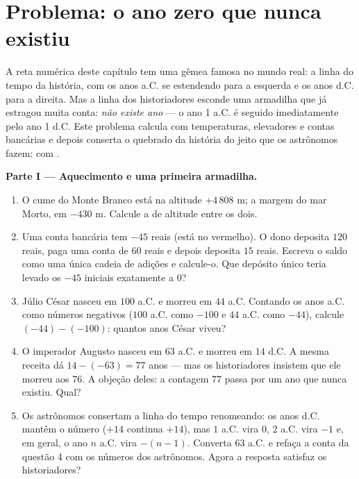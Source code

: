 \section{Problema: o ano zero que nunca existiu}

\begin{problem}
\label{pb:g7:negatives:1}
A reta numérica deste capítulo tem uma gêmea famosa no mundo real: a
linha do tempo da história, com os anos a.C. se estendendo para a
esquerda e os anos d.C. para a direita. Mas a linha dos historiadores
esconde uma armadilha que já estragou muita conta: \emph{não existe ano
} --- o ano 1 a.C. é seguido imediatamente pelo ano 1 d.C. Este
problema calcula com temperaturas, elevadores e contas bancárias e
depois conserta o  quebrado da história do jeito que os astrônomos
fazem: com .

\medskip
\noindent\textbf{Parte I --- Aquecimento e uma primeira armadilha.}
\begin{enumerate}
  \item O cume do Monte Branco está na altitude $+4\,808$ m; a margem
        do mar Morto, em $-430$ m. Calcule a  de altitude
        entre os dois.
  \item Uma conta bancária tem $-45$ reais (está no vermelho). O dono
        deposita $120$ reais, paga uma conta de $60$ reais e depois
        deposita $15$ reais. Escreva o saldo como uma única cadeia de
        adições e calcule-o. Que depósito único teria levado os $-45$
        iniciais exatamente a $0$?
  \item Júlio César nasceu em $100$ a.C. e morreu em $44$ a.C.
        Contando os anos a.C. como números negativos ($100$ a.C. como
        $-100$ e $44$ a.C. como $-44$), calcule $(-44) - (-100)$:
        quantos anos César viveu?
  \item O imperador Augusto nasceu em $63$ a.C. e morreu em $14$ d.C.
        A mesma receita dá $14 - (-63) = 77$ anos --- mas os
        historiadores insistem que ele morreu aos $76$. A objeção
        deles: a contagem $77$ passa por um ano que nunca existiu.
        Qual?
  \item Os astrônomos consertam a linha do tempo renomeando: os anos
        d.C. mantêm o número ($+14$ continua $+14$), mas $1$ a.C. vira
        $0$, $2$ a.C. vira $-1$ e, em geral, o ano $n$ a.C. vira
        $-(n - 1)$. Converta $63$ a.C. e refaça a conta da questão 4
        com os números dos astrônomos. Agora a resposta satisfaz os
        historiadores?
\end{enumerate}


\end{problem}
